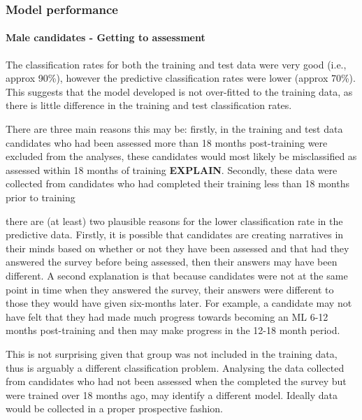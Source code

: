 \documentclass[a4paper,]{book}
\let\oldparagraph\paragraph
\renewcommand{\paragraph}[1]{\oldparagraph{#1}\mbox{}}
\begin{document}
\hypertarget{model-performance}{%
\subsubsection{Model performance}\label{model-performance}}

\hypertarget{male-candidates---getting-to-assessment}{%
\paragraph{Male candidates - Getting to assessment}\label{male-candidates---getting-to-assessment}}

The classification rates for both the training and test data were very good (i.e., approx 90\%), however the predictive classification rates were lower (approx 70\%). This suggests that the model developed is not over-fitted to the training data, as there is little difference in the training and test classification rates.

There are three main reasons this may be: firstly, in the training and test data candidates who had been assessed more than 18 months post-training were excluded from the analyses, these candidates would most likely be misclassified as assessed within 18 months of training \textbf{EXPLAIN}. Secondly, these data were collected from candidates who had completed their training less than 18 months prior to training

there are (at least) two plausible reasons for the lower classification rate in the predictive data. Firstly, it is possible that candidates are creating narratives in their minds based on whether or not they have been assessed and that had they answered the survey before being assessed, then their answers may have been different. A second explanation is that because candidates were not at the same point in time when they answered the survey, their answers were different to those they would have given six-months later. For example, a candidate may not have felt that they had made much progress towards becoming an ML 6-12 months post-training and then may make progress in the 12-18 month period.

This is not surprising given that group was not included in the training data, thus is arguably a different classification problem. Analysing the data collected from candidates who had not been assessed when the completed the survey but were trained over 18 months ago, may identify a different model. Ideally data would be collected in a proper prospective fashion.
\end{document}
